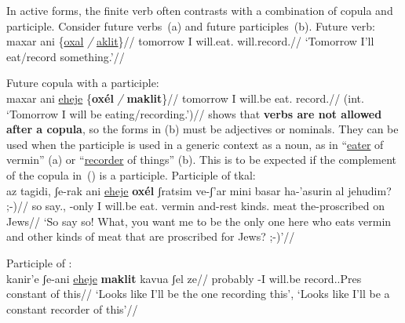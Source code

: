 In active forms, the finite verb often contrasts with a combination of copula and participle. Consider future verbs~(\nextx a) and future participles~(\nextx b).
\pex \label{ex:pres-act}
 \a Future verb:\\
 \begingl
     \gla maxar ani \{\underline{oxal} \emph{/} \underline{aklit}\}//
     \glb tomorrow I will.eat. {} will.record.//
     \glft `Tomorrow I'll eat/record something.'//
 \endgl

 \a Future copula with a participle:\\
 \begingl
     \gla \ljudge{*}maxar ani \underline{eheje} \{\textbf{ox\'el} \emph{/} \textbf{maklit}\}//
     \glb tomorrow I will.be eat. {} record.//
     \glft (int. `Tomorrow I will be eating/recording.')//
 \endgl
\xe
\cite{doron00} shows that \textbf{verbs are not allowed after a copula}, so the forms in (\lastx b) must be adjectives or nominals. They can be used when the participle is used in a generic context as a noun, as in ``\underline{eater} of vermin'' (\nextx a) or ``\underline{recorder} of things'' (\nextx b). This is to be expected if the complement of the copula in~(\nextx) is a participle.
\pex \label{ex:pres-act2}
 \a Participle of {tkal}:\\
 \begingl
     \gla az tagidi, ʃe-rak ani \underline{eheje} \textbf{ox\'el} ʃratsim ve-ʃ'ar mini basar ha-'asurin al jehudim? ;-)//
     \glb so say., -only I will.be eat. vermin and-rest kinds. meat the-proscribed on Jews//
     \glft `So say so! What, you want me to be the only one here who eats vermin and other kinds of meat that are proscribed for Jews? ;-)'\footnotemark//
 \endgl
{}

 \a Participle of {\thif}:\\
 \begingl
     \gla kanir'e ʃe-ani \underline{eheje} \textbf{maklit} kavua ʃel ze//
     \glb probably -I will.be record..Pres constant of this//
     \glft `Looks like I'll be the one recording this', `Looks like I'll be a constant recorder of this'//
 \endgl
\xe

